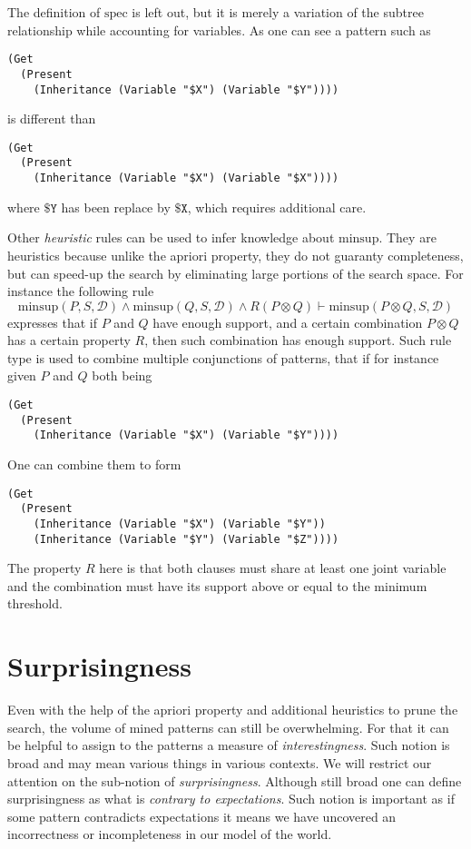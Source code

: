 \documentclass[runningheads]{llncs}
\begin{document}
The definition of $\text{spec}$ is left out, but it is merely a
variation of the subtree relationship while accounting for
variables. As one can see a pattern such as
\begin{verbatim}
(Get
  (Present
    (Inheritance (Variable "$X") (Variable "$Y"))))
\end{verbatim}
is different than
\begin{verbatim}
(Get
  (Present
    (Inheritance (Variable "$X") (Variable "$X"))))
\end{verbatim}
where $\texttt{\$Y}$ has been replace by $\texttt{\$X}$, which
requires additional care.

Other \emph{heuristic} rules can be used to infer knowledge about
$\text{minsup}$. They are heuristics because unlike the apriori
property, they do not guaranty completeness, but can speed-up the
search by eliminating large portions of the search space. For instance
the following rule
$$ \text{minsup}(P, S, \mathcal{D}) \land \text{minsup}(Q, S,
\mathcal{D}) \land R(P \otimes Q) \vdash \text{minsup}(P \otimes Q, S,
\mathcal{D}) $$ expresses that if $P$ and $Q$ have enough support, and
a certain combination $P\otimes Q$ has a certain property $R$, then
such combination has enough support. Such rule type is used to combine
multiple conjunctions of patterns, that if for instance given $P$ and
$Q$ both being
\begin{verbatim}
(Get
  (Present
    (Inheritance (Variable "$X") (Variable "$Y"))))
\end{verbatim}
One can combine them to form
\begin{verbatim}
(Get
  (Present
    (Inheritance (Variable "$X") (Variable "$Y"))
    (Inheritance (Variable "$Y") (Variable "$Z"))))
\end{verbatim}
The property $R$ here is that both clauses must share at least one
joint variable and the combination must have its support above or
equal to the minimum threshold.

\section{Surprisingness}

Even with the help of the apriori property and additional heuristics
to prune the search, the volume of mined patterns can still be
overwhelming. For that it can be helpful to assign to the patterns a
measure of \emph{interestingness}. Such notion is broad and may mean
various things in various contexts. We will restrict our attention on
the sub-notion of \emph{surprisingness}. Although still broad one can
define surprisingness as what is \emph{contrary to expectations}. Such
notion is important as if some pattern contradicts expectations it
means we have uncovered an incorrectness or incompleteness in our
model of the world.
\end{document}
